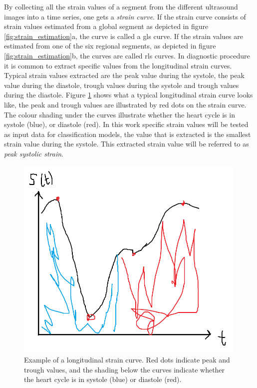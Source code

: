 By collecting all the strain values of a segment from the different ultrasound images into a time series, one gets a \textit{strain curve}. If the strain curve consists of strain values estimated from a global segment as depicted in figure \ref{fig:strain_estimation}a, the curve is called a \acrfull{gls} curve. If the strain values are estimated from one of the six regional segments, as depicted in figure \ref{fig:strain_estimation}b, the curves are called \acrfull{rls} curves. In diagnostic procedure it is common to extract specific values from the longitudinal strain curves. Typical strain values extracted are the peak value during the systole, the peak value during the diastole, trough values during the systole and trough values during the diastole. Figure \ref{fig:pss_illustration} shows what a typical longitudinal strain curve looks like, the peak and trough values are illustrated by red dots on the strain curve. The colour shading under the curves illustrate whether the heart cycle is in systole (blue), or diastole (red). In this work specific strain values will be tested as input data for classification models, the value that is extracted is the smallest strain value during the systole. This extracted strain value will be referred to as \textit{peak systolic strain}.

\begin{figure}[H]
    \centering
    \includegraphics[width=0.99\textwidth]{echocardiography/pss_illustration.png}
    \caption{Example of a longitudinal strain curve. Red dots indicate peak and trough values, and the shading below the curves indicate whether the heart cycle is in systole (blue) or diastole (red).}
    \label{fig:pss_illustration}
\end{figure}

